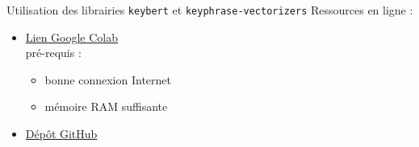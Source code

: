 \begin{frame}{Utilisation des librairies \texttt{keybert} et \texttt{keyphrase-vectorizers}}
Ressources en ligne :
\begin{itemize}
\item \href{https://colab.research.google.com/drive/1sBJP-lJcKZPgIqWzFRNfrBn3domuy1tP?usp=sharing}{Lien Google Colab}\\
pré-requis :
\begin{itemize}
\item bonne connexion Internet
\item mémoire RAM suffisante
\end{itemize}
\item \href{https://github.com/ljpetkovic/Charcot\_KeyBERT\_Keyphrase-Vectorizers?tab=readme-ov-file}{Dépôt GitHub}
\end{itemize}

\end{frame}

